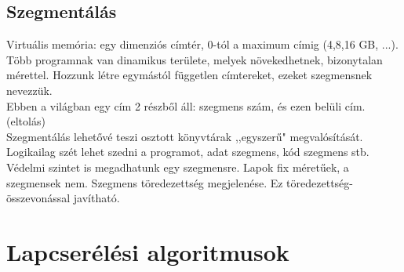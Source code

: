 \documentclass[margin=0px]{article}
\begin{document}
\subsection{Szegmentálás}

Virtuális memória: egy dimenziós címtér, 0-tól a maximum címig (4,8,16 GB, ...). \\
Több programnak van dinamikus területe, melyek növekedhetnek, bizonytalan mérettel. Hozzunk létre egymástól független címtereket, ezeket szegmensnek nevezzük. \\
Ebben a világban egy cím 2 részből áll: szegmens szám, és ezen belüli cím. (eltolás) \\
Szegmentálás lehetővé teszi osztott könyvtárak ,,egyszerű" megvalósítását. Logikailag szét lehet szedni a programot, adat szegmens, kód szegmens stb. Védelmi szintet is megadhatunk egy szegmensre. Lapok fix méretűek, a szegmensek nem. Szegmens töredezettség megjelenése. Ez töredezettség-összevonással javítható.

\section{Lapcserélési algoritmusok}
\end{document}
